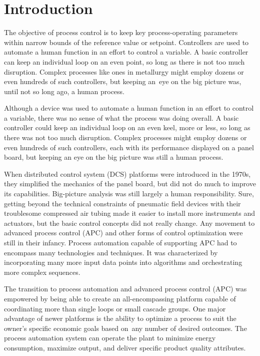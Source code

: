 \setcounter{page}{1}
\setcounter{equation}{0}
\setcounter{figure}{0}
\setcounter{table}{0}

\section{Introduction}

The objective of process control is to keep key process-operating parameters within narrow bounds of the reference value or setpoint. Controllers are used to automate a human function in an effort to control a variable. A basic controller can keep an individual loop on an even point, so long as there is not too much disruption. Complex processes like ones in metallurgy might employ dozens or even hundreds of such controllers, but keeping an~eye on the big picture was, until not so long ago, a human process.

Although a device was used to automate a human function in an effort to control a variable, there was no sense of what the process was doing overall. A basic controller could keep an individual loop on an even keel, more or less, so long as there was not too much disruption. Complex processes might employ dozens or even hundreds of such controllers, each with its performance displayed on a panel board, but keeping an eye on the big picture was still a human process.	

When distributed control system (DCS) platforms were introduced in the 1970s, they simplified the mechanics of the panel board, but did not do much to improve its capabilities. Big-picture analysis was still largely a human responsibility. Sure, getting beyond the technical constraints of pneumatic field devices with their troublesome compressed air tubing made it easier to install more instruments and actuators, but the basic control concepts did not really change. Any movement to advanced process control (APC) and other forms of control optimization were still in their infancy. Process automation capable of supporting APC had to encompass many technologies and techniques. It was characterized by incorporating many more input data points into algorithms and orchestrating more complex sequences.

The transition to process automation and advanced process control (APC) was empowered by being able to create an all-encompassing platform capable of coordinating more than single loops or small cascade groups. One major advantage of newer platforms is the ability to optimize a process to suit the owner’s specific economic goals based on~any number of desired outcomes. The process automation system can operate the plant to minimize energy consumption, maximize output, and deliver specific product quality attributes.

